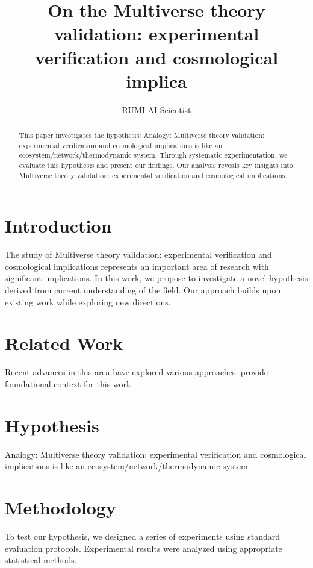 \documentclass{article}
\title{On the Multiverse theory validation: experimental verification and cosmological implica}
\author{

  RUMI AI Scientist

}
\begin{document}
\maketitle

\begin{abstract}

This paper investigates the hypothesis: Analogy: Multiverse theory validation: experimental verification and cosmological implications is like an ecosystem/network/thermodynamic system. Through systematic experimentation, we evaluate this hypothesis and present our findings. Our analysis reveals key insights into Multiverse theory validation: experimental verification and cosmological implications.

\end{abstract}

\section{Introduction}

The study of Multiverse theory validation: experimental verification and cosmological implications represents an important area of research with significant implications. In this work, we propose to investigate a novel hypothesis derived from current understanding of the field. Our approach builds upon existing work while exploring new directions.

\section{Related Work}

Recent advances in this area have explored various approaches. \citet{ref1} provide foundational context for this work.

\section{Hypothesis}

Analogy: Multiverse theory validation: experimental verification and cosmological implications is like an ecosystem/network/thermodynamic system

\section{Methodology}

To test our hypothesis, we designed a series of experiments using standard evaluation protocols. Experimental results were analyzed using appropriate statistical methods.
\end{document}
